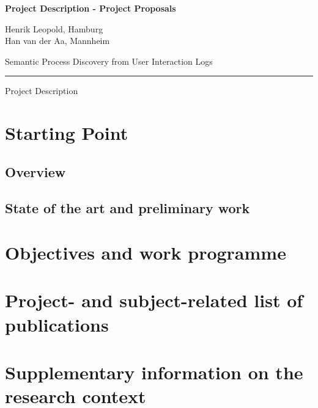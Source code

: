 \documentclass{scrartcl}
\newcommand{\applicants}{\normalfont  Henrik Leopold, Hamburg \\ Han van der Aa, Mannheim \bfseries}
\newcommand{\project}{Semantic Process Discovery from User Interaction Logs}
\begin{document}

{\raggedright{} \normalsize \bfseries 
	Project Description - Project Proposals \par 
	\applicants{} \par
	\project{} \par
	\rule{\textwidth}{0.5pt} \par
	Project Description
}

\newenvironment{nscenter}
 {\parskip=3pt\par\nopagebreak\centering}
 {\par\noindent\ignorespacesafterend}
 
 \vspace{-1em}
\section{Starting Point}

\subsection{Overview}



\subsection{State of the art and preliminary work}


\section{Objectives and work programme}



\section{Project- and subject-related list of publications}
\printbibliography[heading=none]
%




\section{Supplementary information on the research context}

\end{document}
